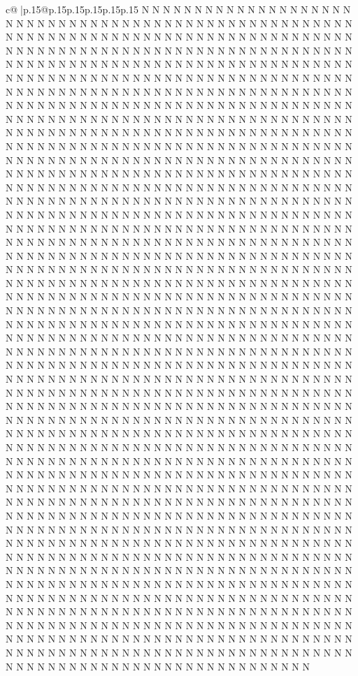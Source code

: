 \documentclass{article}
\begin{document}
{\begin{supertabular}{c@{$\;$}|p{.15\linewidth}@{}p{.15\linewidth}p{.15\linewidth}p{.15\linewidth}p{.15\linewidth}p{.15\linewidth}}
{{{N N N N N N N N N N N N N N N N N N N N N N N N N N N N N N N N N N N N N N N N N N N N N N N N N N N N N N N N N N N N N N N N N N N N N N N N N N N N N N N N N N N N N N N N N N N N N N N N N N N N N N N N N N N N N N N N N N N N N N N N N N N N N N N N N N N N N N N N N N N N N N N N N N N N N N N N N N N N N N N N N N N N N N N N N N N N N N N N N N N N N N N N N N N N N N N N N N N N N N N N N N N N N N N N N N N N N N N N N N N N N N N N N N N N N N N N N N N N N N N N N N N N N N N N N N N N N N N N N N N N N N N N N N N N N N N N N N N N N N N N N N N N N N N N N N N N N N N N N N N N N N N N N N N N N N N N N N N N N N N N N N N N N N N N N N N N N N N N N N N N N N N N N N N N N N N N N N N N N N N N N N N N N N N N N N N N N N N N N N N N N N N N N N N N N N N N N N N N N N N N N N N N N N N N N N N N N N N N N N N N N N N N N N N N N N N N N N N N N N N N N N N N N N N N N N N N N N N N N N N N N N N N N N N N N N N N N N N N N N N N N N N N N N N N N N N N N N N N N N N N N N N N N N N N N N N N N N N N N N N N N N N N N N N N N N N N N N N N N N N N N N N N N N N N N N N N N N N N N N N N N N N N N N N N N N N N N N N N N N N N N N N N N N N N N N N N N N N N N N N N N N N N N N N N N N N N N N N N N N N N N N N N N N N N N N N N N N N N N N N N N N N N N N N N N N N N N N N N N N N N N N N N N N N N N N N N N N N N N N N N N N N N N N N N N N N N N N N N N N N N N N N N N N N N N N N N N N N N N N N N N N N N N N N N N N N N N N N N N N N N N N N N N N N N N N N N N N N N N N N N N N N N N N N N N N N N N N N N N N N N N N N N N N N N N N N N N N N N N N N N N N N N N N N N N N N N N N N N N N N N N N N N N N N N N N N N N N N N N N N N N N N N N N N N N N N N N N N N N N N N N N N N N N N N N N N N N N N N N N N N N N N N N N N N N N N N N N N N N N N N N N N N N N N N N N N N N N N N N N N N N N N N N N N N N N N N N N N N N N N N N N N N N N N N N N N N N N N N N N N N N N N N N N N N N N N N N N N N N N N N N N N N N N N N N N N N N N N N N N N N N N N N N N N N N N N N N N N N N N N N N N N N N N N N N N N N N N N N N N N N N N N N N N N N N N N N N N N N N N N N N N N N N N N N N N N N N N N N N N N N N N N N N N N N N N N N N N N N N N N N N N N N N N N N N N N N N N N N N N N N N N N N N N N N N N N N N N N N N N N N N N N N N N N N N N N N N N N N N N N N N N N N N N N N N N N N N N N N N N N N N N N N N N N N N N N N N N N N N N N N N N N N N N N N N N N N N N N N N N N N N N N N N N N N N N N N N N N N N N N N N N N N N N N N N N N N N N N N N N N N N N N N N N N N N N N N N N N N N N N N N N N N N N N N N N N N N N N N N N N N N N N N N N N N N N N N N N N N N N N N N N N N N N N N N N N N N N N N N N N N N N N N N N N N N N N N N N N N N N N N N N N N N N N N N N N N N N N N N N N N N N N N N N N N N N N N N N N N N N N N N N N N N N N N N N N N N N N N N N N N N N N N N N N N N N N N N N N N N N N N N N N N N N N N N N N N N N N N N N N N N N N N N N N N N N N N N N N N N N N N N N N N N N N N N N N N N N N N N N N N N N N N N N N N N N N N N N N N N N N N N N N N N N N N N N N N N N N N N N N N N N N N N N N N N N N N N N N N N N N N N N N N N N N N N N N N N N N N N N N N N N N N N N N N N N N N N N N N N N N N }}}
\end{supertabular}}
\end{document}
